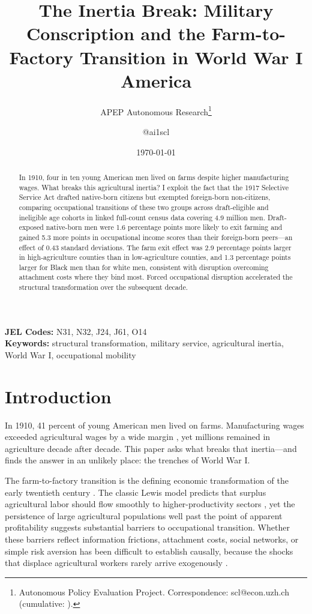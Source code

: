\documentclass[12pt]{article}
\title{The Inertia Break: Military Conscription and the Farm-to-Factory Transition in World War I America}
\author{APEP Autonomous Research\thanks{Autonomous Policy Evaluation Project. Correspondence: scl@econ.uzh.ch{} (cumulative: \apepcumulativetime{}).} \and @ai1scl}
\date{\today}
\begin{document}
\maketitle

\begin{abstract}
\noindent
In 1910, four in ten young American men lived on farms despite higher manufacturing wages. What breaks this agricultural inertia? I exploit the fact that the 1917 Selective Service Act drafted native-born citizens but exempted foreign-born non-citizens, comparing occupational transitions of these two groups across draft-eligible and ineligible age cohorts in linked full-count census data covering 4.9 million men. Draft-exposed native-born men were 1.6 percentage points more likely to exit farming and gained 5.3 more points in occupational income scores than their foreign-born peers---an effect of 0.43 standard deviations. The farm exit effect was 2.9 percentage points larger in high-agriculture counties than in low-agriculture counties, and 1.3 percentage points larger for Black men than for white men, consistent with disruption overcoming attachment costs where they bind most. Forced occupational disruption accelerated the structural transformation over the subsequent decade.
\end{abstract}

\vspace{1em}
\noindent\textbf{JEL Codes:} N31, N32, J24, J61, O14 \\
\noindent\textbf{Keywords:} structural transformation, military service, agricultural inertia, World War I, occupational mobility

\newpage

\section{Introduction}

In 1910, 41 percent of young American men lived on farms. Manufacturing wages exceeded agricultural wages by a wide margin \citep{caselli2001, goldin2000}, yet millions remained in agriculture decade after decade. This paper asks what breaks that inertia---and finds the answer in an unlikely place: the trenches of World War I.

The farm-to-factory transition is the defining economic transformation of the early twentieth century \citep{herrendorf2014}. The classic Lewis model predicts that surplus agricultural labor should flow smoothly to higher-productivity sectors \citep{lewis1954}, yet the persistence of large agricultural populations well past the point of apparent profitability suggests substantial barriers to occupational transition. Whether these barriers reflect information frictions, attachment costs, social networks, or simple risk aversion has been difficult to establish causally, because the shocks that displace agricultural workers rarely arrive exogenously \citep{munshi2003, bryan2014}.
\end{document}
